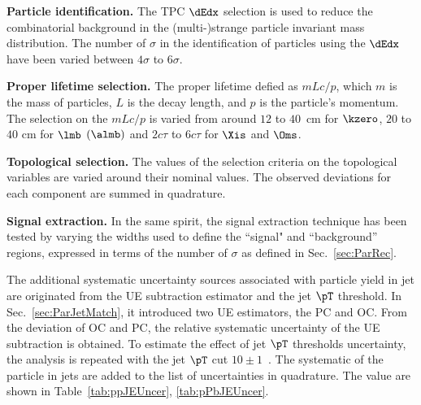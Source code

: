 \documentclass[ALICE,manyauthors]{cernphprep}
\begin{document}
\textbf{Particle identification.} The TPC $\dEdx$ selection is used to reduce the combinatorial background in the (multi-)strange particle invariant mass distribution.
The number of $\sigma$ in the identification of particles using the $\dEdx$ have been varied between $4\sigma$ to $6\sigma$.

\textbf{Proper lifetime selection.} The proper lifetime defied as $mLc/p$, which $m$ is the mass of particles, $L$ is the decay length, and $p$ is the particle's momentum.
The selection on the $mLc/p$ is varied from around $12$ to $40$~cm for $\kzero$, $20$ to $40$ cm for $\lmb$ $(\almb)$ and $2c\tau$ to $6c\tau$ for $\Xis$ and $\Oms$.

\textbf{Topological selection.} The values of the selection criteria on the topological variables are varied around their nominal values.
The observed deviations for each component are summed in quadrature.

\textbf{Signal extraction.} In the same spirit, the signal extraction technique has been tested by varying the widths used to define the ``signal" and ``background'' regions, expressed in terms of the number of $\sigma$ as defined in Sec.~\ref{sec:ParRec}.

The additional systematic uncertainty sources associated with particle yield in jet are originated from the UE subtraction estimator and the jet $\pT$ threshold.
In Sec.~\ref{sec:ParJetMatch}, it introduced two UE estimators, the PC and OC.
From the deviation of OC and PC, the relative systematic uncertainty of the UE subtraction is obtained.
To estimate the effect of jet $\pT$ thresholds uncertainty, the analysis is repeated with the jet $\pT$ cut $10\pm 1$~\GeVc.
The systematic of the particle in jets are added to the list of uncertainties in quadrature.
The value are shown in Table~\ref{tab:ppJEUncer}, \ref{tab:pPbJEUncer}.
\end{document}
